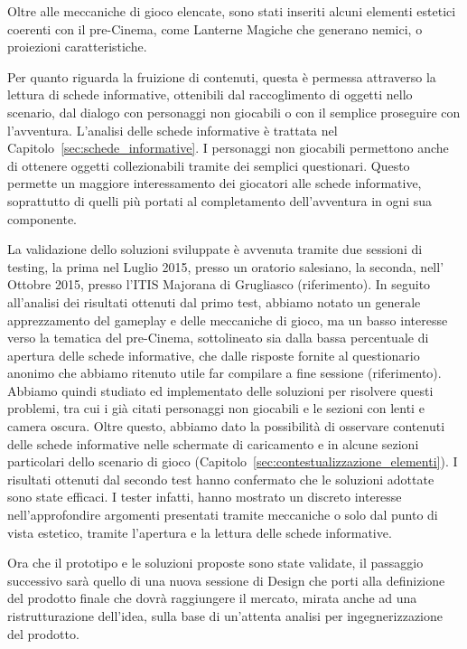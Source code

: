 Oltre alle meccaniche di gioco elencate, sono stati inseriti alcuni elementi estetici coerenti con il pre-Cinema, come Lanterne Magiche che generano nemici, o proiezioni caratteristiche.

Per quanto riguarda la fruizione di contenuti, questa è permessa attraverso la lettura di schede informative, ottenibili dal raccoglimento di oggetti nello scenario, dal dialogo con personaggi non giocabili o con il semplice proseguire con l’avventura. L'analisi delle schede informative è trattata nel Capitolo~\ref{sec:schede_informative}.
I personaggi non giocabili permettono anche di ottenere oggetti collezionabili tramite dei semplici questionari. Questo permette un maggiore interessamento dei giocatori alle schede informative, soprattutto di quelli più portati al completamento dell’avventura in ogni sua componente.

La validazione dello soluzioni sviluppate è avvenuta tramite due sessioni di testing, la prima nel Luglio 2015, presso un oratorio salesiano, la seconda, nell' Ottobre 2015, presso l’ITIS Majorana di Grugliasco (riferimento).
In seguito all’analisi dei risultati ottenuti dal primo test, abbiamo notato un generale apprezzamento del gameplay e delle meccaniche di gioco, ma un basso interesse verso la tematica del pre-Cinema, sottolineato sia dalla bassa percentuale di apertura delle schede informative, che dalle risposte fornite al questionario anonimo che abbiamo ritenuto utile far compilare a fine sessione (riferimento).
Abbiamo quindi studiato ed implementato delle soluzioni per risolvere questi problemi, tra cui i già citati personaggi non giocabili e le sezioni con lenti e camera oscura. Oltre questo, abbiamo dato la possibilità di osservare contenuti delle schede informative nelle schermate di caricamento e in alcune sezioni particolari dello scenario di gioco (Capitolo~\ref{sec:contestualizzazione_elementi}).
I risultati ottenuti dal secondo test hanno confermato che le soluzioni adottate sono state efficaci. I tester infatti, hanno mostrato un discreto interesse nell’approfondire argomenti presentati tramite meccaniche o solo dal punto di vista estetico, tramite l’apertura e la lettura delle schede informative.

Ora che il prototipo e le soluzioni proposte sono state validate, il passaggio successivo sarà quello di una nuova sessione di Design che porti alla definizione del prodotto finale che dovrà raggiungere il mercato, mirata anche ad una ristrutturazione dell’idea, sulla base di un’attenta analisi per ingegnerizzazione del prodotto.

